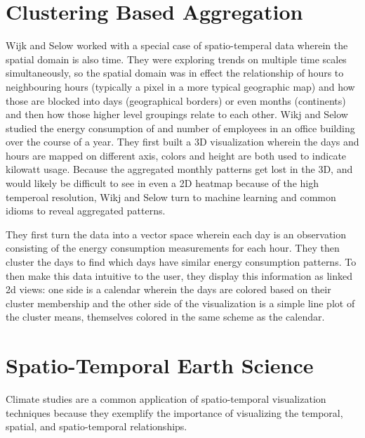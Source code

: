 \documentclass[letterpaper,onecolumn,titlepage]{Ythesis}
\begin{document}
\section{Clustering Based Aggregation}
\label{sec:clustering}
Wijk and Selow \cite{WijkSelow99} worked with a special case of spatio-temperal data wherein the spatial domain is also time. They were exploring trends on multiple time scales simultaneously, so the spatial domain was in effect the relationship of hours to neighbouring hours (typically a pixel in a more typical geographic map) and how those are blocked into days (geographical borders) or even months (continents) and then how those higher level groupings relate to each other. 
Wikj and Selow studied the energy consumption of and number of employees in an office building over the course of a year. They first built a 3D visualization %
wherein the days and hours are mapped on different axis, colors and height are both used to indicate kilowatt usage. Because the aggregated monthly patterns get lost in the 3D, and would likely be difficult to see in even a 2D heatmap because of the high temperoal resolution, Wikj and Selow turn to machine learning and common idioms to reveal aggregated patterns. 

They first turn the data into a vector space wherein each day is an observation consisting of the energy consumption measurements for each hour. They then cluster the days to find which days have similar energy consumption patterns. To then make this data intuitive to the user, they display this information as linked 2d views: one side is a calendar wherein the days are colored based on their cluster membership and the other side of the visualization is a simple line plot of the cluster means, themselves colored in the same scheme as the calendar. %

\section{Spatio-Temporal Earth Science}
\label{sec:climate}
Climate studies are a common application of spatio-temporal visualization techniques because they exemplify the importance of visualizing the temporal, spatial, and spatio-temporal relationships. 
\end{document}
